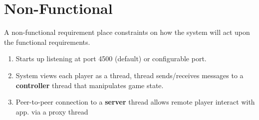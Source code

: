 \documentclass[12pt]{report}
\begin{document}
\section{Non-Functional}
A non-functional requirement place constraints on how the system will act upon the functional requirements.\\
\begin{enumerate}
\item Starts up listening at port 4500 (default) or configurable port.
\item System views each player as a thread, thread sends/receives messages to a \textbf{controller} thread that manipulates game state.
\item Peer-to-peer connection to a \textbf{server} thread allows remote player interact with app. via a proxy thread
\end{enumerate}
\end{document}
